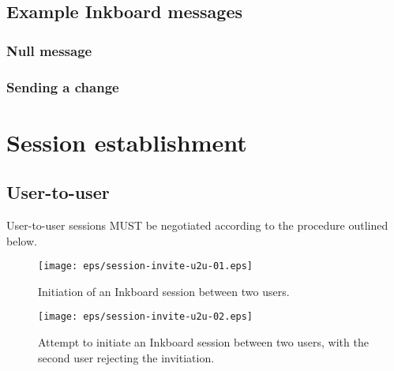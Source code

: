 \documentclass[11pt]{article}
\begin{document}
\subsection{Example Inkboard messages}
\label{example-messages}
\subsubsection{Null message}

\subsubsection{Sending a change}

\section{Session establishment}
\subsection{User-to-user}
User-to-user sessions MUST be negotiated according to the procedure outlined below.

\begin{figure}
\label{u2u-session-establishment-figure-accept}
\centering
\texttt{[image: eps/session-invite-u2u-01.eps]}
\caption{Initiation of an Inkboard session between two users.}
\end{figure}

\begin{figure}
\label{u2u-session-establishment-figure-reject}
\centering
\texttt{[image: eps/session-invite-u2u-02.eps]}
\caption{Attempt to initiate an Inkboard session between two users, with the second user rejecting the invitiation.}
\end{figure}
\end{document}

